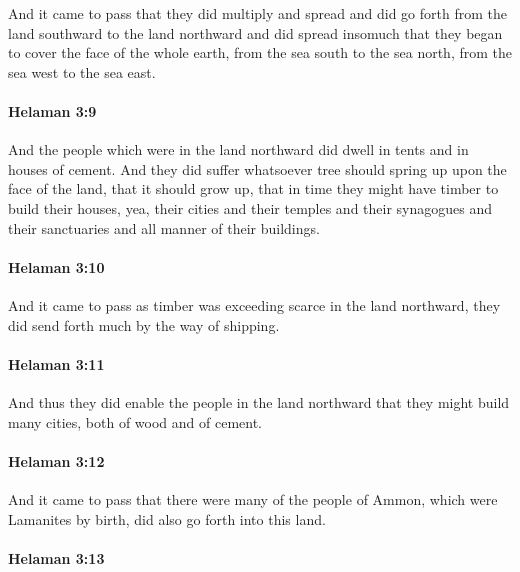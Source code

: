 			And it came to pass that they did multiply and spread
			and did go forth from the land southward to the land northward
			and did spread insomuch that they began to cover the face of the whole earth,
			from the sea south to the sea north, from the sea west to the sea east.

		\paragraph{Helaman 3:9} %
			\label{HELAMAN-3-9}

			And the people which were in the land northward
			did dwell in tents and in houses of cement.
			And they did suffer whatsoever tree should spring up upon the face of the land,
			that it should grow up,
			that in time they might have timber to build their houses,
			yea, their cities and their temples and their synagogues and their sanctuaries
			and all manner of their buildings.

		\paragraph{Helaman 3:10} %
			\label{HELAMAN-3-10}

			And it came to pass as timber was exceeding scarce in the land northward,
			they did send forth much by the way of shipping.

		\paragraph{Helaman 3:11} %
			\label{HELAMAN-3-11}

			And thus they did enable the people in the land northward
			that they might build many cities, both of wood and of cement.

		\paragraph{Helaman 3:12} %
			\label{HELAMAN-3-12}

			And it came to pass that
			there were many of the people of Ammon,
			which were Lamanites by birth,
			did also go forth into this land.

		\paragraph{Helaman 3:13} %
			\label{HELAMAN-3-13}

